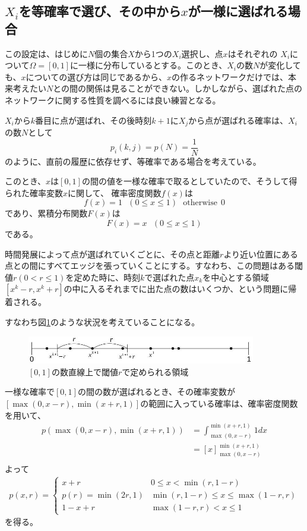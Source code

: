\subsection{$X_{i}$を等確率で選び、その中から$x$が一様に選ばれる場合}

この設定は、はじめに$N$個の集合$X$から1つの$X_{i}$選択し、点$x$はそれぞれの $X_{i}$について$\Omega = [0,1]$に一様に分布しているとする。このとき、$X_{i}$の数$N$が変化しても、$x$についての選び方は同じであるから、$x$の作るネットワークだけでは、本来考えたい$N$との間の関係は見ることができない。しかしながら、選ばれた点のネットワークに関する性質を調べるには良い練習となる。

$X_{i}$から$k$番目に点が選ばれ、その後時刻$k+1$に$X_{j}$から点が選ばれる確率は、$X_{i}$の数$N$として
$$p_{i}(k,j) = p(N) = \frac{1}{N}$$
のように、直前の履歴に依存せず、等確率である場合を考えている。

このとき、$x$は$[0,1]$の間の値を一様な確率で取るとしていたので、そうして得られた確率変数$x$に関して、
確率密度関数$f(x)$は
$$f(x) = 1\ \ \ (0\le x \le 1)\ \ \ \text{otherwise}\ \ 0$$
であり、累積分布関数$F(x)$は
$$F(x) = x\ \ \ (0\le x \le 1)$$
である。

時間発展によって点が選ばれていくごとに、その点と距離$r$より近い位置にある点との間にすべてエッジを張っていくことにする。すなわち、この問題はある閾値$r(0<r\le1)$を定めた時に、時刻$k$で選ばれた点$x_{k}$を中心とする領域$[x^{k}-r, x^{k}+r]$の中に入るそれまでに出た点の数はいくつか、という問題に帰着される。

すなわち図\ref{fig:f2}のような状況を考えていることになる。
\begin{figure}[H]
    \begin{center}
        \includegraphics[width=10cm]{../simple1/simple001_1.jpg}
        \caption{$[0,1]$の数直線上で閾値$r$で定められる領域}
        \label{fig:f2}
    \end{center}
\end{figure}

一様な確率で$[0,1]$の間の数が選ばれるとき、その確率変数が$[\max(0,x-r), \min(x+r,1)]$の範囲に入っている確率は、確率密度関数を用いて、
\begin{align}
p(\max(0, x-r), \min(x+r, 1)) &= \int ^{\min(x+r,1)}_{\max(0, x-r)} 1 dx \nonumber \\
&= \left[ x\right]^{\min(x+r,1)}_{\max(0, x-r)}\\
\end{align}
よって
\begin{eqnarray}
p(x,r)= \left\{ \begin{array}{ll}x+r & 0\le x< \min(r,1-r) \nonumber \\
p(r) = \min(2r, 1) & \min(r, 1-r)\le x \le \max(1-r, r) \nonumber \\
1 - x+r & \max(1-r, r) < x \le 1
\end{array}\right.
\end{eqnarray}
を得る。

